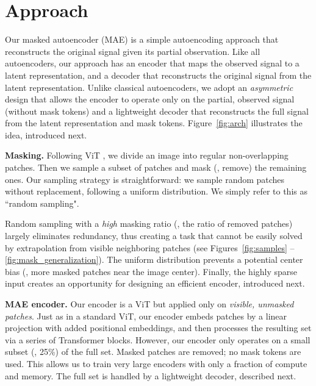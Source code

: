\documentclass[10pt,twocolumn,letterpaper]{article}
\renewcommand{\paragraph}[1]{\vspace{1.25mm}\noindent\textbf{#1}}
\begin{document}
\vspace{1mm}\section{Approach}\vspace{0.5mm}
\label{sec:approach}

Our masked autoencoder (MAE) is a simple autoencoding approach that reconstructs the original signal given its partial observation. Like all autoencoders, our approach has an encoder that maps the observed signal to a latent representation, and a decoder that reconstructs the original signal from the latent representation. Unlike classical autoencoders, we adopt an \emph{asymmetric} design that allows the encoder to operate only on the partial, observed signal (without mask tokens) and a lightweight decoder that reconstructs the full signal from the latent representation and mask tokens. Figure~\ref{fig:arch} illustrates the idea, introduced next.

\paragraph{Masking.} Following ViT \cite{Dosovitskiy2021}, we divide an image into regular non-overlapping patches. Then we sample a subset of patches and mask (\ie, remove) the remaining ones. Our sampling strategy is straightforward: we sample random patches without replacement, following a uniform distribution. We simply refer to this as ``random sampling".

Random sampling with a \textit{high} masking ratio (\ie, the ratio of removed patches) largely eliminates redundancy, thus creating a task that cannot be easily solved by extrapolation from visible neighboring patches (see Figures~\ref{fig:samples} -- \ref{fig:mask_generalization}). The uniform distribution prevents a potential center bias (\ie, more masked patches near the image center). Finally, the highly sparse input creates an opportunity for designing an efficient encoder, introduced next.

\paragraph{MAE encoder.} Our encoder is a ViT \cite{Dosovitskiy2021} but applied only on \emph{visible, unmasked patches}. Just as in a standard ViT, our encoder embeds patches by a linear projection with added positional embeddings, and then processes the resulting set via a series of Transformer blocks. However, our encoder only operates on a small subset (\eg, 25\%) of the full set. Masked patches are removed; no mask tokens are used. This allows us to train very large encoders with only a fraction of compute and memory. The full set is handled by a lightweight decoder, described next.
\end{document}
